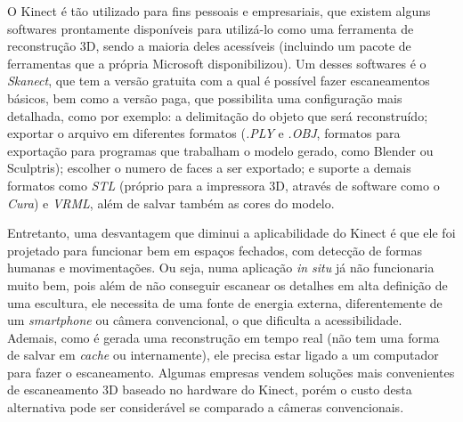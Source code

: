 O Kinect é tão utilizado para fins pessoais e empresariais, que existem alguns
softwares prontamente disponíveis para utilizá-lo como uma ferramenta de
reconstrução 3D, sendo a maioria deles acessíveis (incluindo um pacote de ferramentas que a própria
Microsoft disponibilizou). Um desses softwares
é o \emph{Skanect}, que tem a versão gratuita com a qual é possível fazer escaneamentos
básicos, bem como a versão paga, que possibilita uma configuração mais
detalhada, como por
exemplo: a delimitação do objeto que será reconstruído; exportar o arquivo em
diferentes formatos (\emph{.PLY} e \emph{.OBJ}, formatos para exportação para
programas que trabalham o modelo gerado, como Blender ou Sculptris);
escolher o numero de faces a ser exportado; e suporte a demais formatos como
\emph{STL} (próprio para a impressora 3D, através de software como o \emph{Cura})
e \emph{VRML}, além de salvar também as cores do modelo.

Entretanto, uma desvantagem que diminui a aplicabilidade do Kinect é que ele foi
projetado para funcionar bem em espaços fechados, com detecção de formas humanas
e movimentações. Ou seja, numa aplicação \emph{in situ} já não funcionaria muito
bem, pois além de não conseguir escanear os detalhes em alta definição de uma
escultura, ele necessita de uma fonte de energia externa, diferentemente de um
\emph{smartphone} ou câmera convencional, o que dificulta a acessibilidade.
Ademais, como é gerada uma reconstrução em tempo real (não tem uma forma de salvar em
\emph{cache} ou internamente), ele precisa estar ligado a um computador para fazer o escaneamento.
Algumas empresas vendem soluções mais convenientes de escaneamento 3D baseado no
hardware do Kinect, porém o custo desta alternativa pode ser considerável se
comparado a câmeras convencionais.

